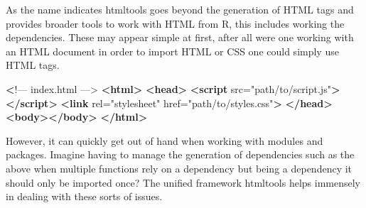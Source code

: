 \documentclass[
]{krantz}
\makeatletter
\newenvironment{Shaded}{\begin{snugshade}}{\end{snugshade}}
\newcommand{\ControlFlowTok}[1]{\textcolor[rgb]{0.27,0.27,0.27}{\textbf{#1}}}
\newcommand{\DataTypeTok}[1]{\textcolor[rgb]{0.27,0.27,0.27}{#1}}
\newcommand{\ErrorTok}[1]{\textcolor[rgb]{0.14,0.14,0.14}{\textbf{#1}}}
\newcommand{\KeywordTok}[1]{\textcolor[rgb]{0.27,0.27,0.27}{\textbf{#1}}}
\newcommand{\NormalTok}[1]{#1}
\newcommand{\OperatorTok}[1]{\textcolor[rgb]{0.43,0.43,0.43}{\textbf{#1}}}
\newcommand{\OtherTok}[1]{\textcolor[rgb]{0.37,0.37,0.37}{#1}}
\newcommand{\StringTok}[1]{\textcolor[rgb]{0.5,0.5,0.5}{#1}}
\newenvironment{kframe}{%
\medskip{}
\setlength{\fboxsep}{.8em}
 \def\at@end@of@kframe{}%
 \ifinner\ifhmode%
  \def\at@end@of@kframe{\end{minipage}}%
  \begin{minipage}{\columnwidth}%
 \fi\fi%
 \def\FrameCommand##1{\hskip\@totalleftmargin \hskip-\fboxsep
 \colorbox{shadecolor}{##1}\hskip-\fboxsep
     \hskip-\linewidth \hskip-\@totalleftmargin \hskip\columnwidth}%
 \MakeFramed {\advance\hsize-\width
   \@totalleftmargin\z@ \linewidth\hsize
   \@setminipage}}%
 {\par\unskip\endMakeFramed%
 \at@end@of@kframe}
\renewenvironment{Shaded}{\begin{kframe}}{\end{kframe}}
\makeatother
\begin{document}
\begin{Shaded}
\end{Shaded}

As the name indicates htmltools goes beyond the generation of HTML tags and provides broader tools to work with HTML from R, this includes working the dependencies. These may appear simple at first, after all were one working with an HTML document in order to import HTML or CSS one could simply use HTML tags.

\begin{Shaded}
\begin{Highlighting}[]
 \ErrorTok{<}\NormalTok{!–– index.html ––>}
\KeywordTok{<html>}
  \KeywordTok{<head>}
    \KeywordTok{<script}\OtherTok{ src=}\StringTok{"path/to/script.js"}\KeywordTok{></script>}
    \KeywordTok{<link}\OtherTok{ rel=}\StringTok{"stylesheet"}\OtherTok{ href=}\StringTok{"path/to/styles.css"}\KeywordTok{>}
  \KeywordTok{</head>}
  \KeywordTok{<body></body>}
\KeywordTok{</html>}
\end{Highlighting}
\end{Shaded}

However, it can quickly get out of hand when working with modules and packages. Imagine having to manage the generation of dependencies such as the above when multiple functions rely on a dependency but being a dependency it should only be imported once? The unified framework htmltools helps immensely in dealing with these sorts of issues.
\end{document}
